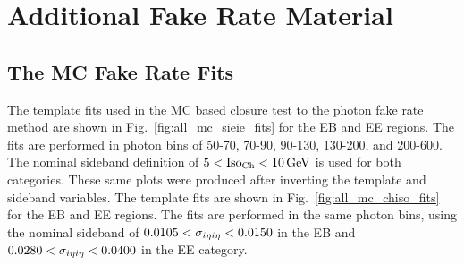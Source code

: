 \chapter{Additional Fake Rate Material}\label{ch:appendix_fake_rate}


\section{The MC Fake Rate Fits}\label{sec:mc_fake_rate_fits}

The \sieie template fits used in the MC based closure test to the photon fake rate method are shown in Fig.~\ref{fig:all_mc_sieie_fits} for the EB and EE regions. The fits are performed in photon \pt bins of 50-70, 70-90, 90-130, 130-200, and 200-600\GeV. The nominal sideband definition of $5 < \text{Iso}_{\text{Ch}} < 10\,\text{Ge\hspace{-.08em}V}$ is used for both categories. These same plots were produced after inverting the template and sideband variables. The \chiso template fits are shown in Fig.~\ref{fig:all_mc_chiso_fits} for the EB and EE regions. The fits are performed in the same photon \pt bins, using the nominal sideband of $0.0105 < \sigma_{i\eta i\eta} < 0.0150$ in the EB and $0.0280 < \sigma_{i\eta i\eta} < 0.0400$ in the EE category.

